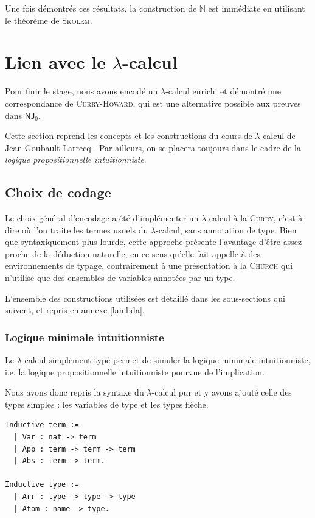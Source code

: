 \documentclass[a4paper]{article}
\newcommand{\N}{\ensuremath{\mathbb{N}}}
\newcommand{\NJ}{\mathsf{NJ}}
\theoremstyle{remark}
\theoremstyle{remark}
\theoremstyle{remark}
\theoremstyle{definition}
\theoremstyle{definition}
\theoremstyle{definition}
\begin{document}
Une fois démontrés ces résultats, la construction de $\N$ est immédiate en utilisant le théorème de \textsc{Skolem}.


\section{Lien avec le $\lambda$-calcul}

Pour finir le stage, nous avons encodé un $\lambda$-calcul enrichi et démontré une correspondance de \textsc{Curry-Howard}, qui est une alternative possible aux preuves dans $\NJ_0$.

Cette section reprend les concepts et les constructions du cours de $\lambda$-calcul de Jean Goubault-Larrecq \cite{polylam}. Par ailleurs, on se placera toujours dans le cadre de la \emph{logique propositionnelle intuitionniste}.

\subsection{Choix de codage}

Le choix général d'encodage a été d'implémenter un $\lambda$-calcul à la \textsc{Curry}, c'est-à-dire où l'on traite les termes usuels du $\lambda$-calcul, sans annotation de type. Bien que syntaxiquement plus lourde, cette approche présente l'avantage d'être assez proche de la déduction naturelle, en ce sens qu'elle fait appelle à des environnements de typage, contrairement à une présentation à la \textsc{Church} qui n'utilise que des ensembles de variables annotées par un type.

L'ensemble des constructions utilisées est détaillé dans les sous-sections qui suivent, et repris en annexe \ref{lambda}.

\subsubsection{Logique minimale intuitionniste}

Le $\lambda$-calcul simplement typé permet de simuler la logique minimale intuitionniste, i.e. la logique propositionnelle intuitionniste pourvue de l'implication.

Nous avons donc repris la syntaxe du $\lambda$-calcul pur et y avons ajouté celle des types simples : les variables de type et les types flèche.
\begin{verbatim}
Inductive term :=
  | Var : nat -> term
  | App : term -> term -> term
  | Abs : term -> term.
  
Inductive type :=
  | Arr : type -> type -> type
  | Atom : name -> type.
\end{verbatim}
\end{document}
